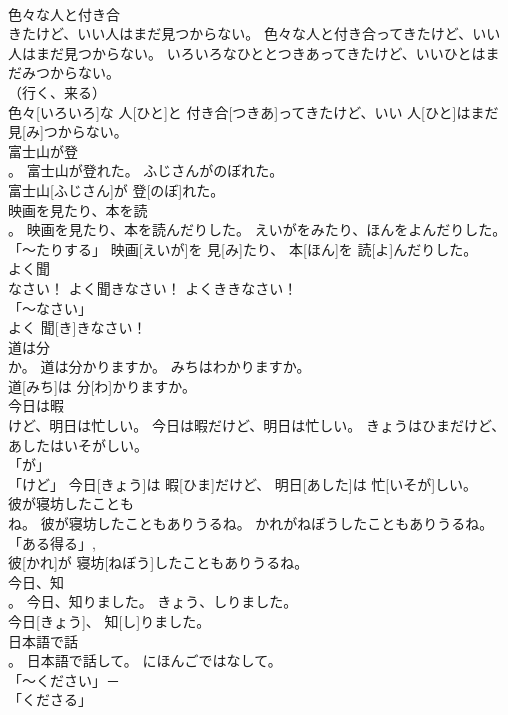 \documentclass[8pt]{extreport}
\begin{document}
\begin{CJK}{UTF8}{min}
\\	色々な人と付き合
\\	きたけど、いい人はまだ見つからない。	色々な人と付き合ってきたけど、いい人はまだ見つからない。	いろいろなひととつきあってきたけど、いいひとはまだみつからない。	
\\	（行く、来る） 
\\	色々[いろいろ]な 人[ひと]と 付き合[つきあ]ってきたけど、いい 人[ひと]はまだ 見[み]つからない。		
\\	富士山が登
\\	。	富士山が登れた。	ふじさんがのぼれた。	
\\	富士山[ふじさん]が 登[のぼ]れた。		
\\	映画を見たり、本を読
\\	。	映画を見たり、本を読んだりした。	えいがをみたり、ほんをよんだりした。	
\\	「～たりする」	映画[えいが]を 見[み]たり、 本[ほん]を 読[よ]んだりした。		
\\	よく聞
\\	なさい！	よく聞きなさい！	よくききなさい！	
\\	「～なさい」 
\\	よく 聞[き]きなさい！		
\\	道は分
\\	か。	道は分かりますか。	みちはわかりますか。	
\\	道[みち]は 分[わ]かりますか。		
\\	今日は暇
\\	けど、明日は忙しい。	今日は暇だけど、明日は忙しい。	きょうはひまだけど、あしたはいそがしい。	
\\	「が」 
\\	「けど」	今日[きょう]は 暇[ひま]だけど、 明日[あした]は 忙[いそが]しい。		
\\	彼が寝坊したことも
\\	ね。	彼が寝坊したこともありうるね。	かれがねぼうしたこともありうるね。	
\\	「ある得る」, 
\\	彼[かれ]が 寝坊[ねぼう]したこともありうるね。		
\\	今日、知
\\	。	今日、知りました。	きょう、しりました。	
\\	今日[きょう]、 知[し]りました。		
\\	日本語で話
\\	。	日本語で話して。	にほんごではなして。	
\\	「～ください」－ 
\\	「くださる」　

\end{CJK}
\end{document}
